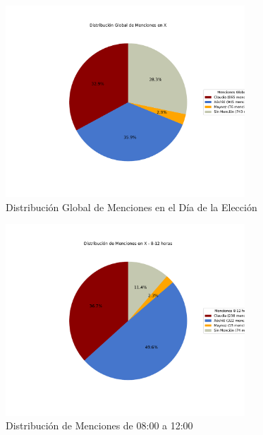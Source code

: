 \documentclass[10pt, a4paper]{article}
\begin{document}
	\vspace{-5mm}
	\begin{figure}[h!]
		\centering
		\includegraphics[width=0.8\textwidth]{grafica_global_x.pdf} %
		\vspace{-15mm}
		\caption{Distribución Global de Menciones en el Día de la Elección}
		\label{fig:globalDiaEleccion} %
	\end{figure}
	
	\begin{figure}[h!]
		\centering
		\includegraphics[width=0.8\textwidth]{grafica_intervalo_8-12.pdf} %
		\vspace{-15mm}
		\caption{Distribución de Menciones de 08:00 a 12:00}
		\label{fig:xIntervalo812} %
	\end{figure}
	
\end{document}
